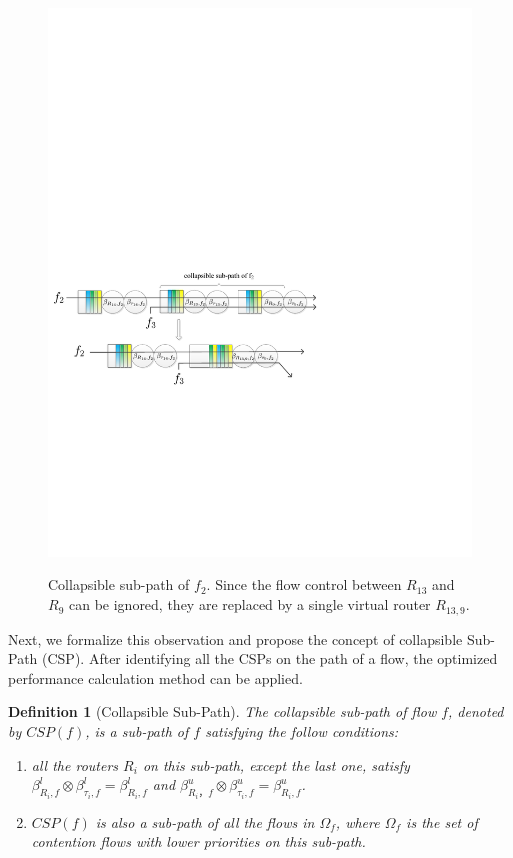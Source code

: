 \documentclass[10pt,journal]{IEEEtran}
\newtheorem{definition}{Definition}
\begin{document}
\begin{figure}
  \centering
  \includegraphics[scale=0.5]{figures/collapse.pdf}\\
  \caption{Collapsible sub-path of $f_2$. Since the flow control between $R_{13}$ and $R_9$ can be ignored, they are replaced by a single virtual router $R_{13,9}$.}\label{collapse}
\end{figure}

Next, we formalize this observation and propose the concept of collapsible Sub-Path (CSP). After identifying all the CSPs on the path of a flow, the optimized performance calculation method can be applied.
\begin{definition}[Collapsible Sub-Path]
The collapsible sub-path of flow $f$, denoted by $CSP(f)$, is a sub-path of $f$ satisfying the follow conditions:
\begin{enumerate}
  \item all the routers $R_i$ on this sub-path, except the last one, satisfy $\beta_{R_{i},f}^l\otimes\beta_{\tau_{i},f}^l=\beta_{R_{i},f}^l$ and $\beta_{R_{i}，f}^u\otimes\beta_{\tau_{i},f}^u=\beta_{R_{i},f}^u$.
  \item $CSP(f)$ is also a sub-path of all the flows in $\Omega_{f}$, where $\Omega_{f}$ is the set of contention flows with lower priorities on this sub-path.
\end{enumerate}
\end{definition}
\end{document}
